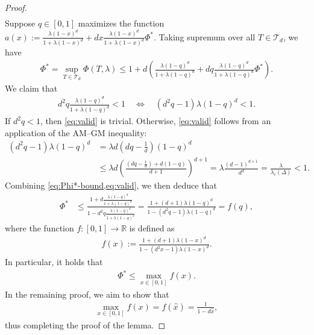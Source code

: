 \documentclass[11pt]{article}
\theoremstyle{plain}
\theoremstyle{definition}
\theoremstyle{remark}
\newcommand{\R}{\mathbb{R}}
\newcommand{\TT}{\mathcal{T}}
\newcommand{\tuple}[1]{\left(#1\right)}
\newcommand{\tp}{\tuple}
\begin{document}
\begin{proof}
\begin{align*}
\end{align*} 
Suppose $q \in [0,1]$ maximizes the function $a(x):= \frac{\lambda (1-x)^d}{1+\lambda (1-x)^d}+dx\frac{\lambda (1-x)^d}{1+\lambda (1-x)^d} \Phi^* $.
Taking supremum over all $T\in\TT_d$, we have
\begin{align}\label{eq:Phi*-bound}
    \Phi^* = \sup_{T\in \TT_d} \Phi(T,\lambda) 
    \le 1 + d \tp{ \frac{\lambda (1-q)^d}{1+\lambda (1-q)^d} + dq\frac{\lambda (1-q)^d}{1+\lambda (1-q)^d} \Phi^*}.
\end{align}
We claim that
\begin{align}\label{eq:valid}
	d^2 q \frac{\lambda (1-q)^d}{1+\lambda (1-q)^d} < 1 
	\quad\Longleftrightarrow\quad
	\left(d^2 q - 1\right) \lambda (1-q)^d < 1. 
\end{align}
If $d^2 q < 1$, then \cref{eq:valid} is trivial.
Otherwise, \cref{eq:valid} follows from an application of the AM--GM inequality: 
\begin{align*}
	\left(d^2 q - 1\right) \lambda (1-q)^d 
	&= \lambda d \left(d q - \frac{1}{d}\right) (1-q)^d \\
	&\le \lambda d \left( \frac{(d q - \frac{1}{d}) + d(1-q)}{d+1} \right)^{d+1} 
	= \lambda \frac{(d-1)^{d+1}}{d^d} = \frac{\lambda}{\lambda_c(\Delta)} < 1.
\end{align*}
Combining \cref{eq:Phi*-bound,eq:valid}, we then deduce that
\begin{align*}
    \Phi^* &\leq \frac{1+ d \frac{\lambda (1-q)^d}{1+\lambda (1-q)^d}}{1-d^2q\frac{\lambda (1-q)^d}{1+\lambda (1-q)^d}}
    = \frac{1+(d+1)\lambda(1-q)^d}{1-(d^2q-1)\lambda(1-q)^d}
    = f(q),
\end{align*}
where the function $f:[0,1] \to \R$ is defined as
\begin{align*}
	f(x) := \frac{1+(d+1)\lambda(1-x)^d}{1-(d^2x-1)\lambda(1-x)^d}.
\end{align*}
In particular, it holds that
\begin{align*}
	\Phi^* \leq \max_{x\in[0,1]} f(x).
\end{align*}
In the remaining proof, we aim to show that
\begin{align*}
	\max_{x\in[0,1]} f(x) = f(\hat x) = \frac{1}{1-d\hat x},
\end{align*}
thus completing the proof of the lemma.


\end{proof}
\end{document}
